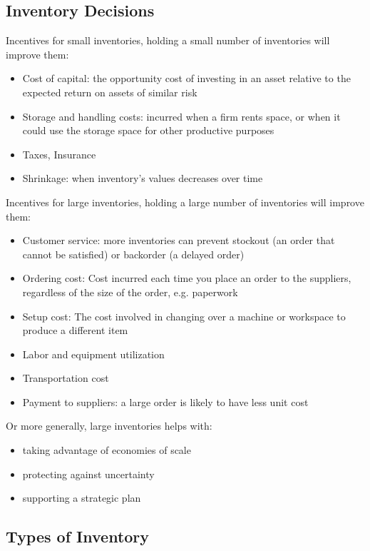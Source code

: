 \documentclass{article}
\begin{document}
\subsection{Inventory Decisions}

Incentives for small inventories, holding a small number of inventories will improve them:
\begin{itemize}
	\item Cost of capital: the opportunity cost of investing in an asset relative to the expected return on assets of similar risk
	\item Storage and handling costs: incurred when a firm rents space, or when it could use the storage space for other productive purposes
	\item Taxes, Insurance
	\item Shrinkage: when inventory's values decreases over time
\end{itemize}

Incentives for large inventories, holding a large number of inventories will improve them:
\begin{itemize}
	\item Customer service: more inventories can prevent stockout (an order that cannot be satisfied) or backorder (a delayed order)
	\item Ordering cost: Cost incurred each time you place an order to the suppliers, regardless of the size of the order, e.g. paperwork
	\item Setup cost: The cost involved in changing over a machine or workspace to produce a different item
	\item Labor and equipment utilization
	\item Transportation cost
	\item Payment to suppliers: a large order is likely to have less unit cost
\end{itemize}

Or more generally, large inventories helps with:
\begin{itemize}
	\item taking advantage of economies of scale
	\item protecting against uncertainty
	\item supporting a strategic plan
\end{itemize}

\subsection{Types of Inventory}
\end{document}
